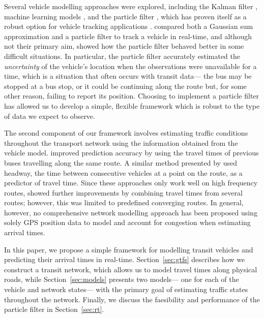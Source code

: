 Several vehicle modelling approaches were explored, 
including the Kalman filter \citep{Dailey_2001,Cathey_2003},
machine learning models \citep{Yu_2006,Chang_2010},
and the particle filter \citep{Hans_2015},
which has proven itself as a robust option for
\rt vehicle tracking applications
\citep{Gustafsson_2002,Davidson_2011}.
\cite{Ulmke_2006} compared both a Gaussian sum approximation and a particle filter
to track a vehicle in real-time,
and although not their primary aim,
showed how the particle filter behaved better in some difficult situations.
In particular, the particle filter accurately estimated the \emph{uncertainty}
of the vehicle's location when the observations were unavailable for a time,
which is a situation that often occurs with transit data---%
the bus may be stopped at a bus stop, or it could be continuing along the route but,
for some other reason, failing to report its position.
Choosing to implement a particle filter has allowed us
to develop a simple, flexible framework
which is robust to the type of data we expect to observe.


The second component of our framework 
involves estimating traffic conditions throughout the transport network
using the information obtained from the vehicle model.
\cite{Yu_2010} improved prediction accuracy by using the travel times
of previous buses travelling along the same route.
A similar method presented by \cite{Hans_2015}
used headway, the time between consecutive vehicles at a point on the route,
as a predictor of travel time.
Since these approaches only work well on high frequency routes,
\cite{Yu_2011} showed further improvements by combining travel times 
from several routes;
however, this was limited to predefined converging routes.
In general, however, no comprehensive network modelling approach has been proposed using
solely GPS position data to model and account for congestion when estimating arrival times.


In this paper, we propose a simple framework for modelling transit vehicles and predicting
their arrival times in real-time.
Section~\ref{sec:gtfs} describes how we construct a transit network,
which allows us to model travel times along physical roads,
while Section~\ref{sec:models} presents two \rt models---%
one for each of the vehicle and network states---%
with the primary goal of estimating \rt traffic states throughout the network.
Finally, we discuss the \rt faesibility and performance
of the particle filter in Section~\ref{sec:rt}.



